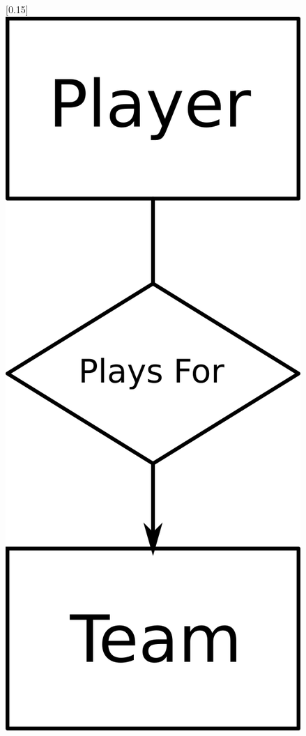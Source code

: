 \documentclass[a4paper]{article}
\begin{document}
\begin{figure}[H]
[0.15\linewidth]{\centering\includegraphics[width=0.6\linewidth]{entity4.png}}

\end{figure}
\end{document}
